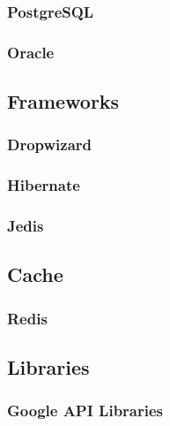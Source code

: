 		\subsubsection{PostgreSQL}
		\subsubsection{Oracle}
	\subsection{Frameworks}
	\subsubsection{Dropwizard}
	\subsubsection{Hibernate}
	\subsubsection{Jedis}		
	\subsection{Cache}
		\subsubsection{Redis}
	\subsection{Libraries}
		\subsubsection{Google API Libraries}
	